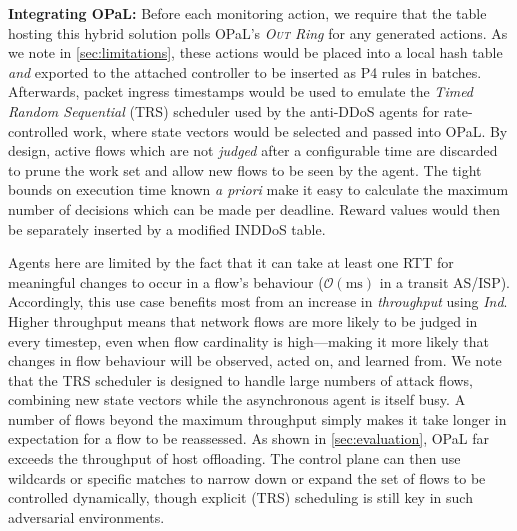 \documentclass[
conference
,10pt
]{IEEEtran}
\newcommand{\fakepara}[1]{\noindent\textbf{#1:}}
\newcommand{\approachshort}{OPaL}
\newcommand{\Coopfw}{\emph{CoOp}}
\newcommand{\Indfw}{\emph{Ind}}
\newcommand{\outring}{\textsc{Out}}
\begin{document}
\fakepara{Integrating \approachshort}
Before each monitoring action, we require that the table hosting this hybrid solution polls \approachshort{}'s \emph{\outring{} Ring} for any generated actions.
As we note in \cref{sec:limitations}, these actions would be placed into a local hash table \emph{and} exported to the attached controller to be inserted as P4 rules in batches.
Afterwards, packet ingress timestamps would be used to emulate the \emph{Timed Random Sequential} (TRS) scheduler used by the anti-DDoS agents for rate-controlled work, where state vectors would be selected and passed into \approachshort.
By design, active flows which are not \emph{judged} after a configurable time are discarded to prune the work set and allow new flows to be seen by the agent.
The tight bounds on execution time known \emph{a priori} make it easy to calculate the maximum number of decisions which can be made per deadline.
Reward values would then be separately inserted by a modified INDDoS table.


Agents here are limited by the fact that it can take at least one RTT for meaningful changes to occur in a flow's behaviour ($\mathcal{O}{\left(\si{\milli\second}\right)}$ in a transit AS/ISP).
Accordingly, this use case benefits most from an increase in \emph{throughput} using \Indfw{}.
Higher throughput means that network flows are more likely to be judged in every timestep, even when flow cardinality is high---making it more likely that changes in flow behaviour will be observed, acted on, and learned from.
We note that the TRS scheduler is designed to handle large numbers of attack flows, combining new state vectors while the asynchronous agent is itself busy.
A number of flows beyond the maximum throughput simply makes it take longer in expectation for a flow to be reassessed.
As shown in \cref{sec:evaluation}, \approachshort{} far exceeds the throughput of host offloading.
The control plane can then use wildcards or specific matches to narrow down or expand the set of flows to be controlled dynamically, though explicit (TRS) scheduling is still key in such adversarial environments.

\end{document}

